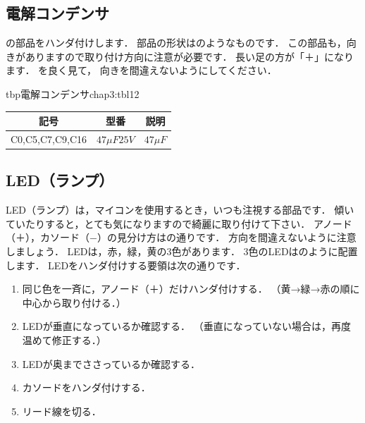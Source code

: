 
\subsection{電解コンデンサ}
の部品をハンダ付けします．
部品の形状はのようなものです．
この部品も，向きがありますので取り付け方向に注意が必要です．
長い足の方が「＋」になります．
を良く見て，
向きを間違えないようにしてください．

\begin{mytable}{tbp}{電解コンデンサ}{chap3:tbl12}
{\small\begin{tabular}{l|l|l}
\hline
\hline
\multicolumn{1}{c|}{記号} &
\multicolumn{1}{c|}{型番} &
\multicolumn{1}{c}{説明} \\
\hline
C0,C5,C7,C9,C16 & $ 47 \mu F  25V $ & $ 47 \mu F$ \\
\end{tabular}}
\end{mytable}


\subsection{LED（ランプ）}
LED（ランプ）は，マイコンを使用するとき，いつも注視する部品です．
傾いていたりすると，とても気になりますので綺麗に取り付けて下さい．
アノード（＋），カソード（−）の見分け方はの通りです．
方向を間違えないように注意しましょう．
LEDは，赤，緑，黄の3色があります．
3色のLEDはのように配置します．
LEDをハンダ付けする要領は次の通りです．

\begin{enumerate}
\item 同じ色を一斉に，アノード（＋）だけハンダ付けする．
（黄→緑→赤の順に中心から取り付ける．）
\item LEDが垂直になっているか確認する．
（垂直になっていない場合は，再度温めて修正する．）
\item LEDが奥までささっているか確認する．
\item カソードをハンダ付けする．
\item リード線を切る．
\end{enumerate}


